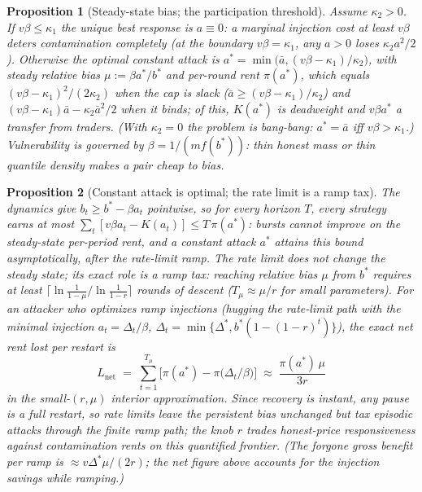 \documentclass[11pt]{article}
\newtheorem{proposition}{Proposition}
\theoremstyle{remark}
\begin{document}
\begin{proposition}[Steady-state bias; the participation threshold]
\label{prop:contbias}
Assume $\kappa_2>0$. If $v\beta\le\kappa_1$ the unique best response is
$a\equiv0$: a marginal injection cost at least $v\beta$ deters
contamination completely (at the boundary $v\beta=\kappa_1$, any $a>0$
loses $\kappa_2a^2/2$). Otherwise the optimal constant attack is
$a^\ast=\min\big(\bar a,(v\beta-\kappa_1)/\kappa_2\big)$, with steady
relative bias $\mu:=\beta a^\ast/b^\ast$ and per-round rent
$\pi(a^\ast)$, which equals $(v\beta-\kappa_1)^2/(2\kappa_2)$ when the
cap is slack ($\bar a\ge(v\beta-\kappa_1)/\kappa_2$) and
$(v\beta-\kappa_1)\bar a-\kappa_2\bar a^2/2$ when it binds; of this,
$K(a^\ast)$ is deadweight and $v\beta a^\ast$ a transfer from traders.
(With $\kappa_2=0$ the problem is bang-bang: $a^\ast=\bar a$ iff
$v\beta>\kappa_1$.)
Vulnerability is governed by $\beta=1/(mf(b^\ast))$: thin honest mass or
thin quantile density makes a pair cheap to bias.
\end{proposition}

\begin{proposition}[Constant attack is optimal; the rate limit is a ramp
tax]\label{prop:contramp}
The dynamics give $b_t\ge b^\ast-\beta a_t$ pointwise, so for every
horizon $T$, every strategy earns at most
$\sum_t[v\beta a_t-K(a_t)]\le T\,\pi(a^\ast)$: bursts cannot improve on
the steady-state per-period rent, and a constant attack $a^\ast$ attains
this bound asymptotically, after the rate-limit ramp. The rate limit
does not change the steady state; its exact role is a \emph{ramp tax}:
reaching relative bias $\mu$ from $b^\ast$ requires at least
$\lceil\ln\frac1{1-\mu}/\ln\frac1{1-r}\rceil$ rounds of descent
($T_\mu\approx\mu/r$ for small parameters). For an attacker who
optimizes ramp injections (hugging the rate-limit path with the minimal
injection $a_t=\Delta_t/\beta$, $\Delta_t=\min\{\Delta^\ast,
b^\ast(1-(1-r)^t)\}$), the exact net rent lost per restart is
\[
L_{\mathrm{net}}\;=\;\sum_{t=1}^{T_\mu}
\Big[\pi(a^\ast)-\pi\big(\Delta_t/\beta\big)\Big]
\;\approx\;\frac{\pi(a^\ast)\,\mu}{3r}
\]
in the small-$(r,\mu)$ interior approximation. Since recovery is
instant, any pause is a full restart, so rate limits leave the
persistent bias unchanged but tax episodic attacks through the finite
ramp path; the knob $r$ trades honest-price responsiveness against
contamination rents on this quantified frontier. (The forgone
\emph{gross} benefit per ramp is
$\approx v\Delta^\ast\mu/(2r)$; the net figure above accounts for the
injection savings while ramping.)
\end{proposition}
\end{document}
